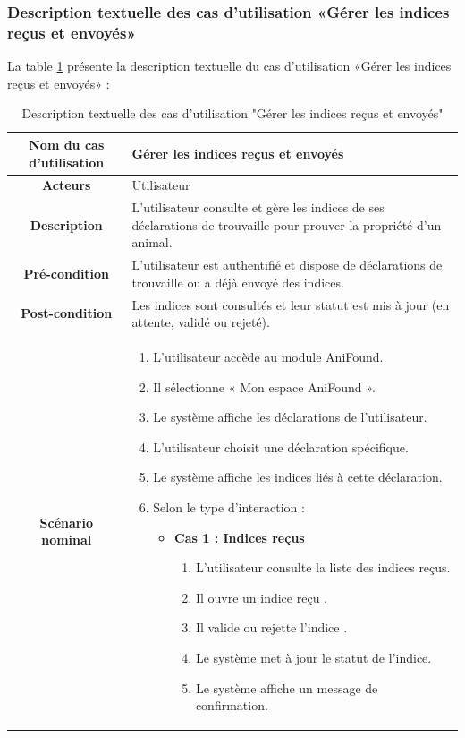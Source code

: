 \subsubsection{ Description textuelle des cas d’utilisation «Gérer les indices reçus et envoyés» }   
La table \ref{tab:gerer_indices_anifound} présente la description textuelle du cas d’utilisation «Gérer les indices reçus et envoyés» :
\begin{longtable}{|c|p{11cm}|} 
\caption{Description textuelle des cas d'utilisation "Gérer les indices reçus et envoyés"}
\label{tab:gerer_indices_anifound} \\
\hline
\cellcolor{coloranifound}\textbf{Nom du cas d'utilisation } & Gérer les indices reçus et envoyés \\
\hline
\cellcolor{coloranifound}\textbf{Acteurs} & Utilisateur \\
\hline
\cellcolor{coloranifound}\textbf{Description } & L’utilisateur consulte et gère les indices de ses déclarations de trouvaille pour prouver la propriété d’un animal. \\
\hline
\cellcolor{coloranifound}\textbf{Pré-condition } & L’utilisateur est authentifié et dispose de déclarations de trouvaille ou a déjà envoyé des indices. \\
\hline
\cellcolor{coloranifound}\textbf{Post-condition } & Les indices sont consultés et leur statut est mis à jour (en attente, validé ou rejeté). \\
\hline

\cellcolor{coloranifound}\textbf{Scénario nominal } &
\begin{enumerate}
\item L’utilisateur accède au module AniFound.
\item Il sélectionne « Mon espace AniFound ».
\item Le système affiche les déclarations de l’utilisateur.
\item L’utilisateur choisit une déclaration spécifique.
\item Le système affiche les indices liés à cette déclaration.
\item Selon le type d’interaction :

\begin{itemize}
\item \textbf{Cas 1 : Indices reçus}
\begin{enumerate}
\item L’utilisateur consulte la liste des indices reçus.
\item Il ouvre un indice reçu .
\item Il valide ou rejette l’indice .
\item Le système met à jour le statut de l’indice.
\item Le système affiche un message de confirmation.
\end{enumerate}


\end{itemize}
\end{enumerate}
\end{longtable}
